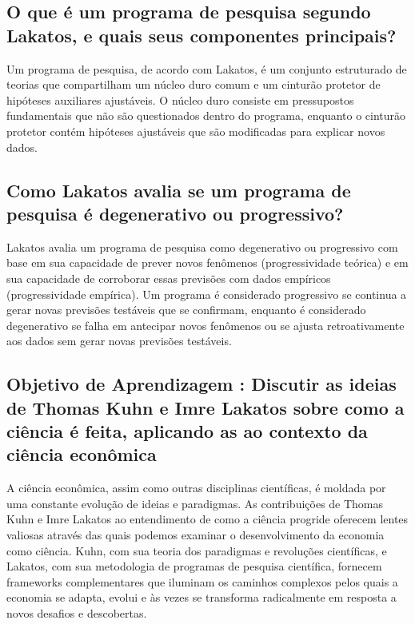 \documentclass[12pt]{article}
\begin{document}
\subsection{\textbf{O que é um programa de pesquisa segundo Lakatos, e quais seus componentes principais?}}
 Um programa de pesquisa, de acordo com Lakatos, é um conjunto estruturado de teorias que compartilham um núcleo duro comum e um cinturão protetor de hipóteses auxiliares ajustáveis. O núcleo duro consiste em pressupostos fundamentais que não são questionados dentro do programa, enquanto o cinturão protetor contém hipóteses ajustáveis que são modificadas para explicar novos dados.
\subsection{\textbf{Como Lakatos avalia se um programa de pesquisa é degenerativo ou progressivo?}}
 Lakatos avalia um programa de pesquisa como degenerativo ou progressivo com base em sua capacidade de prever novos fenômenos (progressividade teórica) e em sua capacidade de corroborar essas previsões com dados empíricos (progressividade empírica). Um programa é considerado progressivo se continua a gerar novas previsões testáveis que se confirmam, enquanto é considerado degenerativo se falha em antecipar novos fenômenos ou se ajusta retroativamente aos dados sem gerar novas previsões testáveis.
\subsection{\textbf{Objetivo de Aprendizagem : Discutir as ideias de Thomas Kuhn e Imre Lakatos sobre como a ciência é feita, aplicando as ao contexto da ciência econômica}}
A ciência econômica, assim como outras disciplinas científicas, é moldada por uma constante evolução de ideias e paradigmas. As contribuições de Thomas Kuhn e Imre Lakatos ao entendimento de como a ciência progride oferecem lentes valiosas através das quais podemos examinar o desenvolvimento da economia como ciência. Kuhn, com sua teoria dos paradigmas e revoluções científicas, e Lakatos, com sua metodologia de programas de pesquisa científica, fornecem frameworks complementares que iluminam os caminhos complexos pelos quais a economia se adapta, evolui e às vezes se transforma radicalmente em resposta a novos desafios e descobertas.
\end{document}
